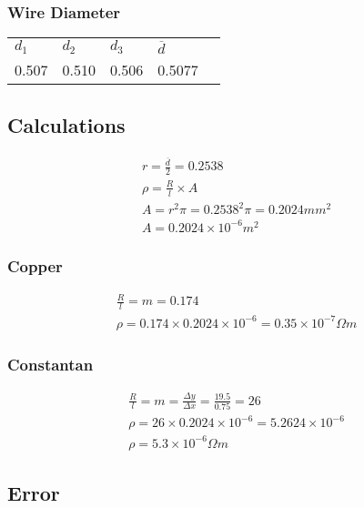 \documentclass{article}
\begin{document}
\subsubsection{Wire Diameter}

\begin{center}
\begin{tabular}{l|l|l|ll}
$d_1$ & $d_2$ & $d_3$ & $\overline{d}$ \\ \cline{1-4}
0.507 & 0.510 & 0.506 & 0.5077
\end{tabular}
\end{center}

\subsection{Calculations}

\begin{gather}
	r = \frac{\overline{d}}{2} = 0.2538 \\
	\rho = \frac{R}{l}\times A \\
	A = r^2 \pi = 0.2538^2 \pi = 0.2024 \si{mm^2} \\
	A = 0.2024 \times 10^{-6} \si{m^2}
\end{gather}


\subsubsection{Copper}

\begin{gather}
	\frac{R}{l} = m = 0.174 \\
	\rho = 0.174 \times 0.2024 \times 10^{-6} = 0.35 \times 10^{-7} \si{\Omega m}
\end{gather}

\subsubsection{Constantan}

\begin{gather}
	\frac{R}{l} = m = \frac{\Delta y}{\Delta x} = \frac{19.5}{0.75} = 26 \\
	\rho = 26 \times 0.2024 \times 10^{-6} = 5.2624 \times 10 ^{-6} \\
	\rho = 5.3 \times 10^{-6} \si{\Omega m}
\end{gather}

\subsection{Error}
\end{document}
